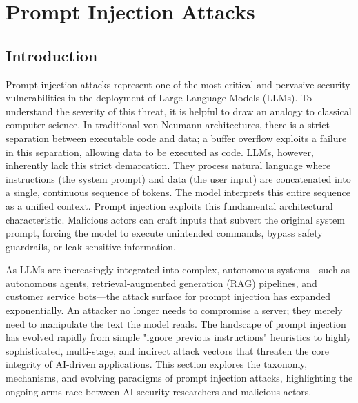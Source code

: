 \documentclass[11pt,a4paper]{article}
\begin{document}
\section{Prompt Injection Attacks}

\subsection{Introduction}
Prompt injection attacks represent one of the most critical and pervasive security vulnerabilities in the deployment of Large Language Models (LLMs). To understand the severity of this threat, it is helpful to draw an analogy to classical computer science. In traditional von Neumann architectures, there is a strict separation between executable code and data; a buffer overflow exploits a failure in this separation, allowing data to be executed as code. LLMs, however, inherently lack this strict demarcation. They process natural language where instructions (the system prompt) and data (the user input) are concatenated into a single, continuous sequence of tokens. The model interprets this entire sequence as a unified context. Prompt injection exploits this fundamental architectural characteristic. Malicious actors can craft inputs that subvert the original system prompt, forcing the model to execute unintended commands, bypass safety guardrails, or leak sensitive information. 

As LLMs are increasingly integrated into complex, autonomous systems---such as autonomous agents, retrieval-augmented generation (RAG) pipelines, and customer service bots---the attack surface for prompt injection has expanded exponentially. An attacker no longer needs to compromise a server; they merely need to manipulate the text the model reads. The landscape of prompt injection has evolved rapidly from simple "ignore previous instructions" heuristics to highly sophisticated, multi-stage, and indirect attack vectors that threaten the core integrity of AI-driven applications. This section explores the taxonomy, mechanisms, and evolving paradigms of prompt injection attacks, highlighting the ongoing arms race between AI security researchers and malicious actors.
\end{document}
